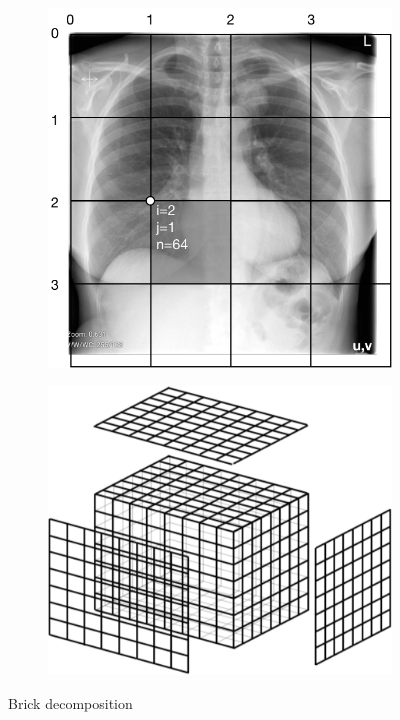 \begin{figure}[htbp] %
    \centering
    \begin{subfigure}{0.49\textwidth}
       \centering
       \includegraphics[width=0.70\linewidth]{src/figs/blocks.png} 
       \label{fig:bricks}
    \end{subfigure} 
    \begin{subfigure}{0.49\textwidth}
        \centering
        \includegraphics[width=0.99\linewidth]{figs/grid.pdf} 
        \label{fig:brickboundary}
    \end{subfigure} 
    \caption{Brick decomposition}
\end{figure}


